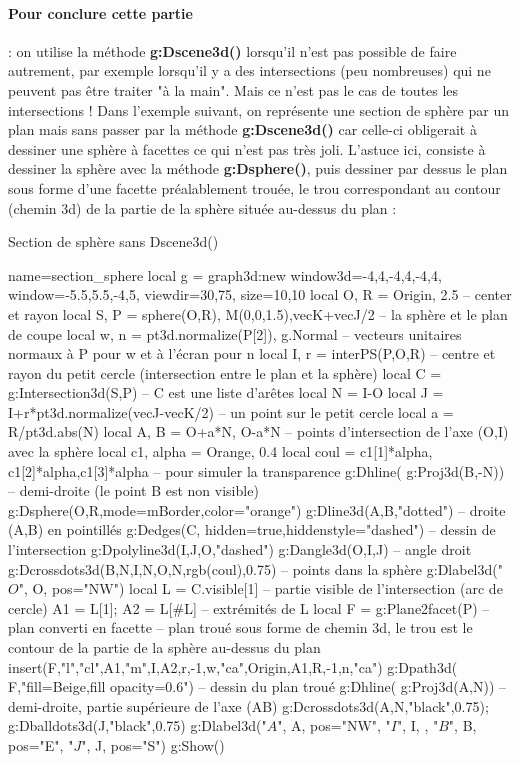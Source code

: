 \paragraph{Pour conclure cette partie} : on utilise la méthode \textbf{g:Dscene3d()} lorsqu'il n'est pas possible de faire autrement, par exemple lorsqu'il y a des intersections (peu nombreuses) qui ne peuvent pas être traiter "à la main". Mais ce n'est pas le cas de toutes les intersections ! Dans l'exemple suivant, on représente une section de sphère par un plan mais sans passer par la méthode \textbf{g:Dscene3d()} car celle-ci obligerait à dessiner une sphère à facettes ce qui n'est pas très joli. L'astuce ici, consiste à dessiner la sphère avec la méthode \textbf{g:Dsphere()}, puis dessiner par dessus le plan sous forme d'une facette préalablement trouée, le trou correspondant au contour (chemin 3d) de la partie de la sphère située au-dessus du plan :
\begin{demo}{Section de sphère sans Dscene3d()}
\begin{luadraw}{name=section_sphere}
local g = graph3d:new{ window3d={-4,4,-4,4,-4,4}, window={-5.5,5.5,-4,5}, viewdir={30,75}, size={10,10}}
local O, R = Origin, 2.5 -- center et rayon
local S, P = sphere(O,R), {M(0,0,1.5),vecK+vecJ/2} -- la sphère et le plan de coupe
local w, n = pt3d.normalize(P[2]), g.Normal -- vecteurs unitaires normaux à P pour w et à l'écran pour n
local I, r = interPS(P,{O,R}) -- centre et rayon du petit cercle (intersection entre le plan et la sphère)
local C = g:Intersection3d(S,P) -- C est une liste d'arêtes
local N = I-O
local J = I+r*pt3d.normalize(vecJ-vecK/2) -- un point sur le petit cercle
local a = R/pt3d.abs(N)
local A, B = O+a*N, O-a*N -- points d'intersection de l'axe (O,I) avec la sphère
local c1, alpha = Orange, 0.4
local coul = {c1[1]*alpha, c1[2]*alpha,c1[3]*alpha} -- pour simuler la transparence
g:Dhline( g:Proj3d({B,-N})) -- demi-droite (le point B est non visible)
g:Dsphere(O,R,{mode=mBorder,color="orange"})
g:Dline3d(A,B,"dotted") -- droite (A,B) en pointillés
g:Dedges(C, {hidden=true,hiddenstyle="dashed"}) -- dessin de l'intersection
g:Dpolyline3d({I,J,O},"dashed") 
g:Dangle3d(O,I,J)  -- angle droit
g:Dcrossdots3d({{B,N},{I,N},{O,N}},rgb(coul),0.75) -- points dans la sphère
g:Dlabel3d("$O$", O, {pos="NW"})
local L = C.visible[1] -- partie visible de l'intersection (arc de cercle)
A1 = L[1]; A2 = L[#L] -- extrémités de L
local F = g:Plane2facet(P) -- plan converti en facette
-- plan troué sous forme de chemin 3d, le trou est le contour de la partie de la sphère au-dessus du plan
insert(F,{"l","cl",A1,"m",I,A2,r,-1,w,"ca",Origin,A1,R,-1,n,"ca"})
g:Dpath3d( F,"fill=Beige,fill opacity=0.6") -- dessin du plan troué
g:Dhline( g:Proj3d({A,N})) -- demi-droite, partie supérieure de l'axe (AB)
g:Dcrossdots3d({A,N},"black",0.75); g:Dballdots3d(J,"black",0.75)
g:Dlabel3d("$A$", A, {pos="NW"}, "$I$", I, {}, "$B$", B, {pos="E"}, "$J$", J, {pos="S"})
g:Show()            
\end{luadraw}
\end{demo}


